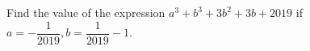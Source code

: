 Find the value of the expression $a^{3}+b^{3}+3b^{2}+3b+2019$ if $a=-\dfrac{1}{2019}, b=\dfrac{1}{2019}-1$.
